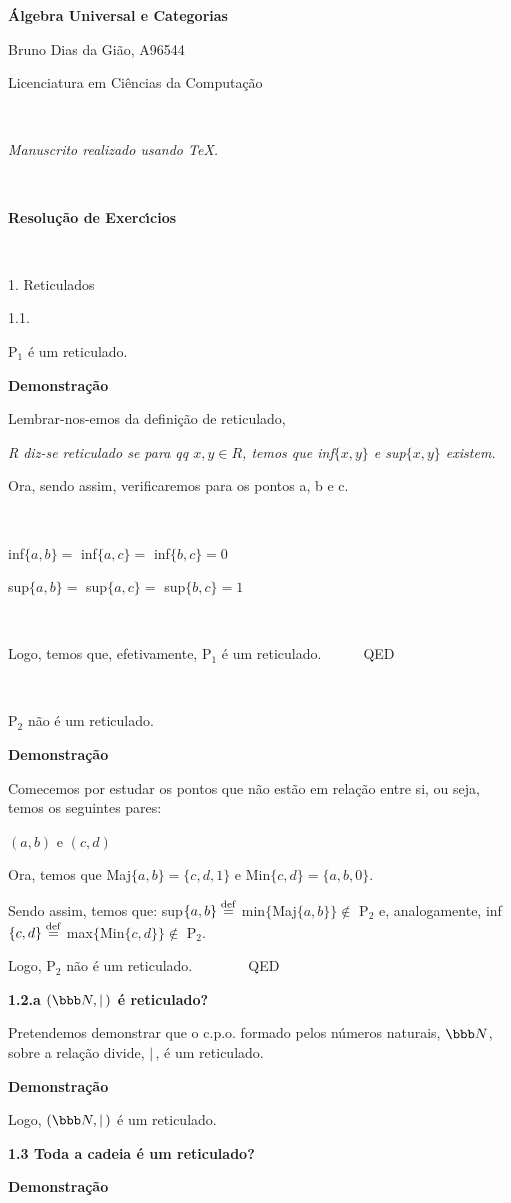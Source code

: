 \relax



\bf
\startcenter
\'Algebra Universal e Categorias

Bruno Dias da Gi\~ao, A96544

Licenciatura em Ci\^encias da Computa\c{c}\~ao
\stopcenter

\

\startcenter
\sl Manuscrito realizado usando \TeX.
\stopcenter

\

\bf
Resolu\c{c}\~ao de Exerc\'{\i}cios

\

1. Reticulados

1.1.
\rm

P$_1$ \'{e} um reticulado.

\bf Demonstra\c{c}\~ao \rm

Lembrar-nos-emos da defini\c{c}\~{a}o de reticulado,

\startcenter
\it R diz-se reticulado se para qq $x,y \in R$, temos que
            inf$\{x,y\}$ e sup$\{x,y\}$ existem. \rm
\stopcenter

Ora, sendo assim, verificaremos para os pontos a, b e c.

\

\startcenter
inf$\{a,b\} =$ inf$\{a,c\} =$ inf$\{b,c\} = 0$

sup$\{a,b\} =$ sup$\{a,c\} =$ sup$\{b,c\} = 1$
\stopcenter

\

Logo, temos que, efetivamente, P$_1$ \'e um reticulado.\ \ \ \ \ \ QED

\

P$_2$ n\~{a}o \'{e} um reticulado.

\bf Demonstra\c{c}\~{a}o \rm

Comecemos por estudar os pontos que n\~ao est\~ao em rela\c{c}\~{a}o entre si, ou
seja, temos os seguintes pares:

\startcenter
$(a,b)$ e $(c,d)$
\stopcenter

Ora, temos que Maj$\{a,b\} = \{c,d,1\}$ e Min$\{c,d\} = \{a,b,0\}$.

Sendo assim, temos que:
\startcenter
sup$\{a,b\} \buildrel \rm def \over =$ min$\{$Maj$\{a,b\}\} \notin$ P$_2$
\stopcenter
e, analogamente,
\startcenter
inf$\{c,d\} \buildrel \rm def \over =$ max$\{$Min$\{c,d\}\} \notin$ P$_2$.
\stopcenter

Logo, P$_2$ n\~{a}o \'{e} um reticulado.\ \ \ \ \ \ \ \ QED

\bf
1.2.a
\rm $(\bbb N, \mid\,)$ \'e reticulado?

Pretendemos demonstrar que o c.p.o. formado pelos n\'umeros naturais, $\bbb N$, sobre a
rela\c{c}\~{a}o divide, $\mid\,$, \'{e} um reticulado.

\bf Demonstra\c{c}\~ao \rm



Logo, $(\bbb N, \mid\,)$ \'{e} um reticulado.

\vfil \break

\bf
1.3
\rm Toda a cadeia \'e um reticulado?

\bf Demonstra\c{c}\~ao

\bye
